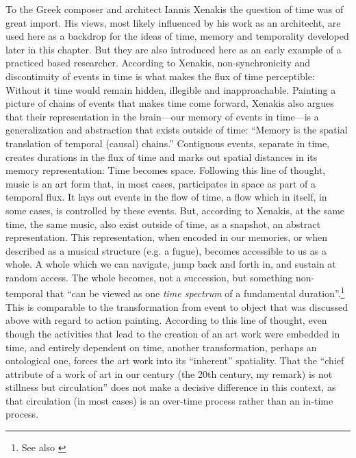 To the Greek composer and architect Iannis Xenakis the question of time was of great import. His views, most likely influenced by his work as an architecht, are used here as a backdrop for the ideas of time, memory and temporality developed later in this chapter. But they are also introduced here as an early example of a practiced based researcher. According to Xenakis, non-synchronicity and discontinuity of events in time is what makes the flux of time perceptible: Without it time would remain hidden, illegible and inapproachable. Painting a picture of chains of events that makes time come forward, Xenakis also argues that their representation in the brain---our memory of events in time---is a generalization and abstraction that exists outside of time: ``Memory is the spatial translation of temporal (causal) chains.'' \parencite[263]{xenakis71} 
Contiguous events, separate in time, creates durations in the flux of time and marks out spatial distances in its memory representation: Time becomes space. Following this line of thought, music is an art form that, in most cases, participates in space as part of a temporal flux. It lays out events in the flow of time, a flow which in itself, in some cases, is controlled by these events. But, according to Xenakis, at the same time, the same music, also exist outside of time, as a snapshot, an abstract representation.
This representation, when encoded in our memories, or when described as a musical structure (e.g. a fugue), becomes accessible to us as a whole. A whole which we can navigate, jump back and forth in, and sustain at random access. The whole becomes, not a succession, but something non-temporal that ``can be viewed as one \emph{time spectrum} of a fundamental duration''.\footnote{\cite[73, my italics.]{roads} See also \cite{stockhausen57}}
This is comparable to the transformation from event to object that was discussed above with regard to action painting. According to this line of thought, even though the activities that lead to the creation of an art work were embedded in time, and entirely dependent on time, another transformation, perhaps an ontological one, forces the art work into its ``inherent'' spatiality. That the ``chief attribute of a work of art in our century (the 20th century, my remark) is not stillness but circulation'' \parencite[93]{rosenberg66} does not make a decisive difference in this context, as that circulation (in most cases) is an over-time process rather than an in-time process.

